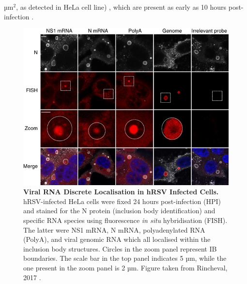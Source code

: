 \(\mbox{µm}^2\), as detected in HeLa cell line) \cite{Rincheval2017FunctionalVirus}, which are present as early as 10 hours post-infection \cite{Jobe2021BovineResponses}.

\begin{figure}
    \centering
    \includegraphics[width=1\linewidth]{04. Introduction/Figs/11. RSV IBs.png}
    \caption[Viral RNA Discrete Localisation in hRSV Infected Cells.]{\textbf{Viral RNA Discrete Localisation in hRSV Infected Cells.} hRSV-infected HeLa cells were fixed 24 hours post-infection (HPI) and stained for the N protein (inclusion body identification) and specific RNA species using fluorescence \textit{in situ} hybridisation (FISH). The latter were NS1 mRNA, N mRNA, polyadenylated RNA (PolyA), and viral genomic RNA which all localised within the inclusion body structures. Circles in the zoom panel represent IB boundaries. The scale bar in the top panel indicates 5 µm, while the one present in the zoom panel is 2 µm. Figure taken from Rincheval, 2017 \cite{Rincheval2017FunctionalVirus}.}
    \label{fig:Viral RNA Discrete Localisation in hRSV Infected Cells}
\end{figure}

